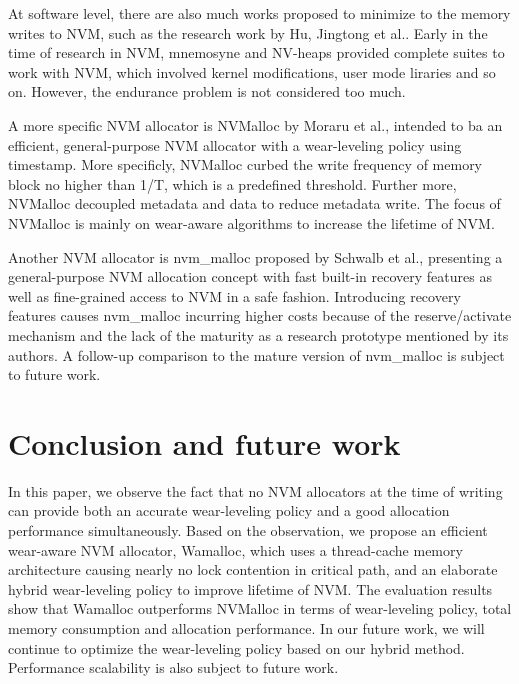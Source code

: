\documentclass[10pt, conference, compsocconf]{IEEEtran}
\begin{document}
At software level, there are also much works proposed to minimize to the memory writes to NVM, 
such as the research work by Hu, Jingtong et al.\cite{hu2013software}.
Early in the time of research in NVM, 
mnemosyne\cite{volos2011mnemosyne} and NV-heaps\cite{coburn2011nv} provided complete suites to work with NVM, 
which involved kernel modifications, user mode liraries and so on.
However, the endurance problem is not considered too much.

A more specific NVM allocator is NVMalloc by Moraru et al.\cite{moraru2013consistent},
intended to ba an efficient, general-purpose NVM allocator with a wear-leveling policy using timestamp.
More specificly, NVMalloc curbed the write frequency of memory block no higher than 1/T, which is a predefined threshold.
Further more, NVMalloc decoupled metadata and data to reduce metadata write.
The focus of NVMalloc is mainly on wear-aware algorithms to increase the lifetime of NVM.

Another NVM allocator is nvm\_malloc proposed by Schwalb et al.\cite{schwalbnvm},
presenting a general-purpose NVM allocation concept with fast built-in recovery features
as well as fine-grained access to NVM in a safe fashion.
Introducing recovery features causes nvm\_malloc incurring higher costs
because of the reserve/activate mechanism and the lack of the maturity as a research prototype mentioned by its authors.
A follow-up comparison to the mature version of nvm\_malloc is subject to future work.

\section{Conclusion and future work}

In this paper, we observe the fact that
no NVM allocators at the time of writing 
can provide both an accurate wear-leveling policy and a good allocation performance simultaneously.
Based on the observation, we propose an efficient wear-aware NVM allocator, Wamalloc,
which uses a thread-cache memory architecture causing nearly no lock contention in critical path,
and an elaborate hybrid wear-leveling policy to improve lifetime of NVM.
The evaluation results show that
Wamalloc outperforms NVMalloc in terms of wear-leveling policy, total memory consumption and allocation performance.
In our future work, we will continue to optimize the wear-leveling policy based on our hybrid method.
Performance scalability is also subject to future work.
\end{document}
